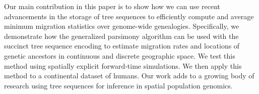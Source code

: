 Our main contribution in this paper is to show how we can use recent
advancements in the storage of tree sequences to efficiently compute and
average minimum migration statistics over genome-wide genealogies. Specifically,
we demonstrate how the generalized parsimony algorithm
\cite{Sankoff_1975, Sankoff_Rousseau_1975} can be used with the succinct tree 
sequence encoding \cite{Kelleher_etal_2016} to estimate migration rates and 
locations of genetic ancestors in continuous and discrete geographic space.
We test this method using spatially explicit forward-time simulations. We then 
apply this method to a continental dataset of humans. Our work adds to a
growing body of research using tree sequences for inference in spatial 
population genomics.





